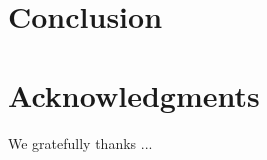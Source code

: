 \documentclass[preprint,10pt]{sigplanconf}
\newcommand{\seclabel}[1]{\label{sec:#1}}
\begin{document}
\section{Conclusion}\seclabel{conclusion}



\section*{Acknowledgments}

\small We gratefully thanks ...



\end{document}
